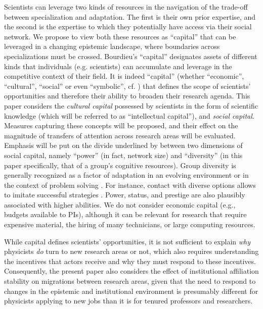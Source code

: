 \documentclass{article}
\begin{document}
Scientists can leverage two kinds of resources in the navigation of the trade-off between specialization and adaptation. The first is their own prior expertise, and the second is the expertise to which they potentially have access via their social network. We propose to view both these resources as ``capital'' \citep{Bourdieu1986} that can be leveraged in a changing epistemic landscape, where boundaries across specializations must be crossed. Bourdieu's ``capital'' designates assets of different kinds that individuals (e.g. scientists) can accumulate and leverage in the competitive context of their field. It is indeed ``capital''  (whether ``economic'', ``cultural'', ``social'' or even ``symbolic'', cf. \citealt{Bourdieu1986}) that defines the scope of scientists' opportunities and therefore their ability to broaden their research agenda. This paper considers the \textit{cultural capital} possessed by scientists in the form of scientific knowledge (which will be referred to as ``intellectual capital''), and \textit{social capital}. Measures capturing these concepts will be proposed, and their effect on the magnitude of transfers of attention across research areas will be evaluated. Emphasis will be put on the divide underlined by \citet{Abbasi2014} between two dimensions of social capital, namely ``power'' (in fact, network size) and ``diversity'' (in this paper specifically, that of a group's cognitive resources). Group diversity is generally recognized as a factor of adaptation in an evolving environment \citep{Schimmelpfennig2021,Muthukrishna2016,Henrich2004} or in the context of problem solving \citep{Hong2004}. For instance, contact with diverse options allows to imitate successful strategies \citep{Henrich2004}. Power, status, and prestige are also plausibly associated with higher abilities. We do not consider economic capital (e.g., budgets available to PIs), although it can be relevant for research that require expensive material,  the hiring of many technicians, or large computing resources.

While capital defines scientists' opportunities, it is not sufficient to explain \textit{why} physicists \textit{do} turn to new research areas or not, which also requires understanding the incentives that actors receive and why they must respond to these incentives. Consequently, the present paper also considers the effect of institutional affiliation stability on migrations between research areas, given that the need to respond to changes in the epistemic and institutional environment is presumably different for physicists applying to new jobs than it is for tenured professors and researchers.%
\end{document}
